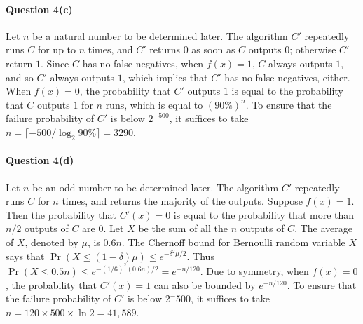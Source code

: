 \documentclass[12pt,answers]{exam}
\theoremstyle{remark}
\begin{document}
\paragraph{Question 4(c)} Let $n$ be a natural number to be determined later. The algorithm $C'$ repeatedly runs $C$ for up to $n$ times, and $C'$ returns $0$ as soon as $C$ outputs $0$; otherwise $C'$ return $1$. Since $C$ has no false negatives, when $f(x) = 1$, $C$ always outputs $1$, and so $C'$ always outputs $1$, which implies that $C'$ has no false negatives, either. When $f(x) = 0$, the probability that $C'$ outputs $1$ is equal to the probability that $C$ outputs $1$ for $n$ runs, which is equal to $(90\%)^n$. To ensure that the failure probability of $C'$ is below $2^{-500}$, it suffices to take $n = \lceil -500 / \log_2 90\%\rceil = 3290$.

\paragraph{Question 4(d)} Let $n$ be an odd number to be determined later. The algorithm $C'$ repeatedly runs $C$ for $n$ times, and returns the majority of the outputs. Suppose $f(x) = 1$. Then the probability that $C'(x) = 0$ is equal to the probability that more than $n/2$ outputs of $C$ are $0$. Let $X$ be the sum of all the $n$ outputs of $C$. The average of $X$, denoted by $\mu$, is $0.6n$. The Chernoff bound for Bernoulli random variable $X$ says that $\Pr(X \le (1-\delta)\mu) \le e^{-\delta^2 \mu/2}$. Thus $\Pr(X \le 0.5n) \le e^{-(1/6)^2(0.6n)/2} = e^{-n/120}$. Due to symmetry, when $f(x) = 0$, the probability that $C'(x) = 1$ can also be bounded by $e^{-n/120}$. To ensure that the failure probability of $C'$ is below $2^-500$, it suffices to take $n = 120 \times 500 \times \ln 2 = 41,589$.
\end{document}
